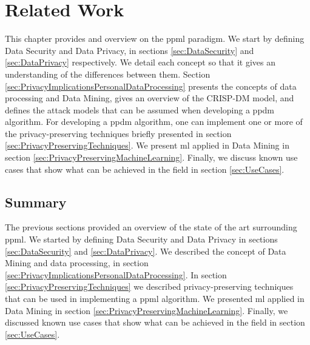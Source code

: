 %

\acresetall

\chapter{Related Work}
\label{ch:RelatedWork}


This chapter provides and overview on the \ac{ppml} paradigm.
We start by defining Data Security and Data Privacy, in sections \ref{sec:DataSecurity} and \ref{sec:DataPrivacy} respectively. We detail each concept so that it gives an understanding of the differences between them.
Section \ref{sec:PrivacyImplicationsPersonalDataProcessing} presents the concepts of data processing and Data Mining, gives an overview of the CRISP-DM model, and defines the attack models that can be assumed when developing a \ac{ppdm} algorithm.
For developing a \ac{ppdm} algorithm, one can implement one or more of the privacy-preserving techniques briefly presented in section \ref{sec:PrivacyPreservingTechniques}. 
We present \ac{ml} applied in Data Mining in section \ref{sec:PrivacyPreservingMachineLearning}. Finally, we discuss known use cases that show what can be achieved in the field in section \ref{sec:UseCases}.









\section{Summary}
\label{sec:SummaryRelatedWork}

The previous sections provided an overview of the state of the art surrounding \ac{ppml}.
We started by defining Data Security and Data Privacy in sections \ref{sec:DataSecurity} and \ref{sec:DataPrivacy}.
We described the concept of Data Mining and data processing, in section \ref{sec:PrivacyImplicationsPersonalDataProcessing}.
In section \ref{sec:PrivacyPreservingTechniques} we described privacy-preserving techniques that can be used in implementing a \ac{ppml} algorithm.
We presented \ac{ml} applied in Data Mining in section \ref{sec:PrivacyPreservingMachineLearning}. Finally, we discussed known use cases that show what can be achieved in the field in section \ref{sec:UseCases}.


